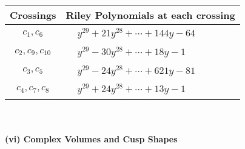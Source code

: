 \documentclass[1p]{elsarticle_modified}
\theoremstyle{definition}
\begin{document}
\begin{tabular}{m{50pt}|m{274pt}}
Crossings & \hspace{64pt}Riley Polynomials at each crossing \\
\hline $$\begin{aligned}c_{1},c_{6}\end{aligned}$$&$\begin{aligned}
&y^{29}+21 y^{28}+\cdots+144 y-64
\end{aligned}$\\
\hline $$\begin{aligned}c_{2},c_{9},c_{10}\end{aligned}$$&$\begin{aligned}
&y^{29}-30 y^{28}+\cdots+18 y-1
\end{aligned}$\\
\hline $$\begin{aligned}c_{3},c_{5}\end{aligned}$$&$\begin{aligned}
&y^{29}-24 y^{28}+\cdots+621 y-81
\end{aligned}$\\
\hline $$\begin{aligned}c_{4},c_{7},c_{8}\end{aligned}$$&$\begin{aligned}
&y^{29}+24 y^{28}+\cdots+13 y-1
\end{aligned}$\\
\hline
\end{tabular}\\~\\
\newpage\flushleft \textbf{(vi) Complex Volumes and Cusp Shapes}
\end{document}
